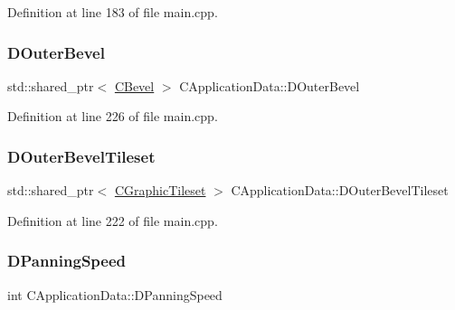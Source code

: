 Definition at line 183 of file main.\+cpp.

\hypertarget{classCApplicationData_abc2b04aa05148da81145ff6d6bc2bf01}{}\label{classCApplicationData_abc2b04aa05148da81145ff6d6bc2bf01} 
\subsubsection{\texorpdfstring{D\+Outer\+Bevel}{DOuterBevel}}
{\footnotesize\ttfamily std\+::shared\+\_\+ptr$<$ \hyperlink{classCBevel}{C\+Bevel} $>$ C\+Application\+Data\+::\+D\+Outer\+Bevel\hspace{0.3cm}{\ttfamily [protected]}}



Definition at line 226 of file main.\+cpp.

\hypertarget{classCApplicationData_ac1ebf4e2d6c8a445c7e8de643a348093}{}\label{classCApplicationData_ac1ebf4e2d6c8a445c7e8de643a348093} 
\subsubsection{\texorpdfstring{D\+Outer\+Bevel\+Tileset}{DOuterBevelTileset}}
{\footnotesize\ttfamily std\+::shared\+\_\+ptr$<$ \hyperlink{classCGraphicTileset}{C\+Graphic\+Tileset} $>$ C\+Application\+Data\+::\+D\+Outer\+Bevel\+Tileset\hspace{0.3cm}{\ttfamily [protected]}}



Definition at line 222 of file main.\+cpp.

\hypertarget{classCApplicationData_a9e07e8374b20abfbb57f656e92be8404}{}\label{classCApplicationData_a9e07e8374b20abfbb57f656e92be8404} 
\subsubsection{\texorpdfstring{D\+Panning\+Speed}{DPanningSpeed}}
{\footnotesize\ttfamily int C\+Application\+Data\+::\+D\+Panning\+Speed\hspace{0.3cm}{\ttfamily [protected]}}



